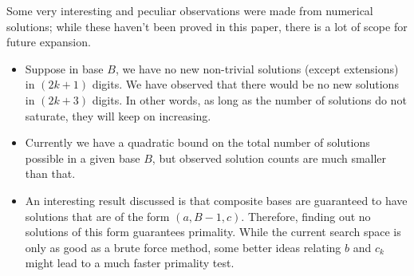 \documentclass[sn-mathphys]{sn-jnl}%
\theoremstyle{thmstyleone}%
\theoremstyle{thmstyletwo}%
\theoremstyle{thmstylethree}%
\begin{document}
Some very interesting and peculiar observations were made from numerical solutions; while
these haven't been proved in this paper, there is a lot of scope for future expansion.

\begin{itemize}
    \item Suppose in base $B$, we have no new non-trivial solutions
    (except extensions) in $(2k+1)$ digits. We have observed that there would be no new solutions
    in $(2k+3)$ digits. In other words, as long as the number of solutions do not saturate, they will
    keep on increasing.
    \item Currently we have a quadratic bound on the total number of solutions possible in a given base $B$,
    but observed solution counts are much smaller than that.
    \item An interesting result discussed is that composite bases are guaranteed to have
    solutions that are of the form $(a, B-1, c)$. Therefore, finding out no solutions of
    this form guarantees primality. While the current search space is only as good as a brute
    force method, some better ideas relating $b$ and $c_k$ might lead to a
    much faster primality test.
\end{itemize}
\end{document}
